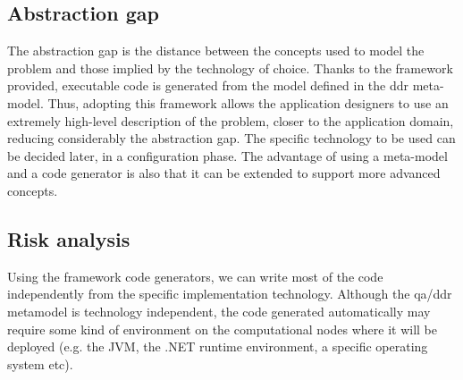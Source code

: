 \documentclass{llncs}
\begin{document}
\subsection{Abstraction gap}
The abstraction gap is the distance between the concepts used to model the problem and those implied by the technology of choice. Thanks to the framework provided, executable code is generated from the model defined in the ddr meta-model. Thus, adopting this framework allows the application designers to use an extremely high-level description of the problem, closer to the application domain, reducing considerably the abstraction gap. The specific technology to be used can be decided later, in a configuration phase. The advantage of using a meta-model and a code generator is also that it can be extended to support more advanced concepts.
\subsection{Risk analysis}
Using the framework code generators, we can write most of the code independently from the specific implementation technology. Although the qa/ddr metamodel is technology independent, the code generated automatically may require some kind of environment on the computational nodes where it will be deployed (e.g. the JVM, the .NET runtime environment, a specific operating system etc).
\end{document}
